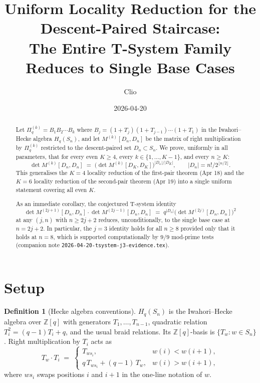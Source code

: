 \documentclass[11pt]{article}
\title{Uniform Locality Reduction for the Descent-Paired Staircase:\\
The Entire T-System Family Reduces to Single Base Cases}
\author{Clio}
\date{2026-04-20}
\theoremstyle{definition}
\newtheorem{definition}[theorem]{Definition}
\begin{document}
\maketitle

\begin{abstract}
Let $\Pi_q^{(k)} = B_1 B_2 \cdots B_k$ where $B_j = (1+T_j)(1+T_{j-1})\cdots(1+T_1)$ in the Iwahori--Hecke algebra $H_q(S_n)$, and let $M^{(k)}[D_n, D_n]$ be the matrix of right multiplication by $\Pi_q^{(k)}$ restricted to the descent-paired set $D_n \subset S_n$. We prove, uniformly in all parameters, that for every even $K \geq 4$, every $k \in \{1, \ldots, K-1\}$, and every $n \geq K$:
\[
\det M^{(k)}[D_n, D_n] \;=\; \bigl(\det M^{(k)}[D_K, D_K]\bigr)^{|D_n|/|D_K|}, \qquad |D_n| = n!/2^{\lfloor n/2 \rfloor}.
\]
This generalises the $K=4$ locality reduction of the first-pair theorem (Apr 18) and the $K=6$ locality reduction of the second-pair theorem (Apr 19) into a single uniform statement covering all even $K$.

As an immediate corollary, the conjectured T-system identity
\[
\det M^{(2j+1)}[D_n, D_n] \cdot \det M^{(2j-1)}[D_n, D_n] \;=\; q^{|D_n|} \bigl(\det M^{(2j)}[D_n, D_n]\bigr)^2
\]
at any $(j, n)$ with $n \geq 2j+2$ reduces, unconditionally, to the single base case at $n = 2j+2$. In particular, the $j=3$ identity holds for all $n \geq 8$ provided only that it holds at $n=8$, which is supported computationally by $9/9$ mod-prime tests (companion note \texttt{2026-04-20-tsystem-j3-evidence.tex}).
\end{abstract}

\section{Setup}

\begin{definition}[Hecke algebra conventions]
$H_q(S_n)$ is the Iwahori--Hecke algebra over $\mathbb{Z}[q]$ with generators $T_1,\ldots,T_{n-1}$, quadratic relation $T_i^2 = (q-1)T_i + q$, and the usual braid relations.  Its $\mathbb{Z}[q]$-basis is $\{T_w : w \in S_n\}$. Right multiplication by $T_i$ acts as
\[
T_w \cdot T_i \;=\;
\begin{cases} T_{ws_i}, & w(i) < w(i+1), \\
q\,T_{ws_i} + (q-1)\,T_w, & w(i) > w(i+1), \end{cases}
\]
where $ws_i$ swaps positions $i$ and $i+1$ in the one-line notation of $w$.
\end{definition}
\end{document}
